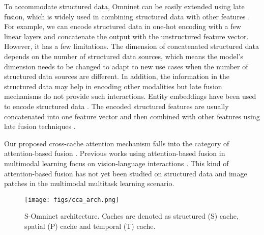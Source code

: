 \documentclass{article}
\begin{document}

To accommodate structured data, Omninet can be easily extended using late fusion, which is widely used in combining structured data with other features \cite{liu2020fusing,zhang2020combining}. For example, we can encode structured data in one-hot encoding with a few linear layers and concatenate the output with the unstructured feature vector. However, it has a few limitations. The dimension of concatenated structured data depends on the number of structured data sources, which means the model's dimension needs to be changed to adapt to new use cases when the number of structured data sources are different. In addition, the information in the structured data may help in encoding other modalities but late fusion mechanisms do not provide such interactions. Entity embeddings \cite{guo2016entity} have been used to encode structured data \cite{zhu2020location,kulkarni2021pvg}. The encoded structured features are usually concatenated into one feature vector and then combined with other features using late fusion techniques \cite{kulkarni2021pvg}.

Our proposed cross-cache attention mechanism falls into the category of attention-based fusion \cite{zhang2020multimodal}. Previous works using attention-based fusion in multimodal learning focus on vision-language interactions \cite{tsai2019multimodal}. This kind of attention-based fusion has not yet been studied on structured data and image patches in the multimodal multitask learning scenario. 


\begin{figure*}
    \centering

    \texttt{[image: figs/cca\_arch.png]}

    \caption{S-Omninet architecture. Caches are denoted as structured (S) cache, spatial (P) cache and temporal (T) cache.}
    \label{fig:cca}
\end{figure*}
\end{document}
